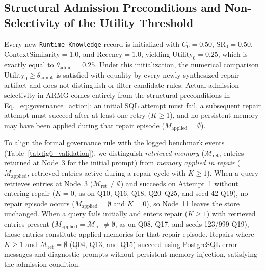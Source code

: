 \subsection{Structural Admission Preconditions and Non-Selectivity of the Utility Threshold}
Every new \texttt{Runtime-Knowledge} record is initialized with $C_0 = 0.50$, $\text{SR}_0 = 0.50$, $\text{ContextSimilarity} = 1.0$, and $\text{Recency} = 1.0$, yielding $\text{Utility}_0 = 0.25$, which is exactly equal to $\theta_{\text{admit}} = 0.25$. Under this initialization, the numerical comparison $\text{Utility}_0 \ge \theta_{\text{admit}}$ is satisfied with equality by every newly synthesized repair artifact and does not distinguish or filter candidate rules. Actual admission selectivity in ARMG comes entirely from the structural preconditions in Eq.~\eqref{eq:governance_action}: an initial SQL attempt must fail, a subsequent repair attempt must succeed after at least one retry ($K \ge 1$), and no persistent memory may have been applied during that repair episode ($M_{\text{applied}} = \emptyset$).

To align the formal governance rule with the logged benchmark events (Table~\ref{tab:fig6_validation}), we distinguish \emph{retrieved memory} ($\mathcal{M}_{\text{ret}}$, entries returned at Node~3 for the initial prompt) from \emph{memory applied in repair} ($M_{\text{applied}}$, retrieved entries active during a repair cycle with $K \ge 1$). When a query retrieves entries at Node~3 ($\mathcal{M}_{\text{ret}} \neq \emptyset$) and succeeds on Attempt~1 without entering repair ($K = 0$, as on Q10, Q16, Q18, Q20--Q25, and seed-42 Q19), no repair episode occurs ($M_{\text{applied}} = \emptyset$ and $K = 0$), so Node~11 leaves the store unchanged. When a query fails initially and enters repair ($K \ge 1$) with retrieved entries present ($M_{\text{applied}} = \mathcal{M}_{\text{ret}} \neq \emptyset$, as on Q08, Q17, and seeds-123/999 Q19), those entries constitute applied memories for that repair episode. Repairs where $K \ge 1$ and $\mathcal{M}_{\text{ret}} = \emptyset$ (Q04, Q13, and Q15) succeed using PostgreSQL error messages and diagnostic prompts without persistent memory injection, satisfying the admission condition.

